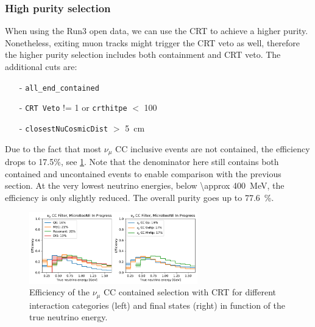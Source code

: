 \subsubsection{High purity selection}
When using the Run3 open data, we can use the CRT to achieve  a higher purity. Nonetheless, exiting muon tracks might trigger the CRT veto as well, therefore the higher purity selection includes both containment and CRT veto. The additional cuts are:
\begin{itemize}
    \item[-] \texttt{all\_end\_contained}
    \item[-] \texttt{CRT Veto} != 1 or \texttt{crthitpe} $<$ 100
    \item[-] \texttt{closestNuCosmicDist} $>$ \SI{5}{\cm}
\end{itemize}
Due to the fact that most $\nu_\mu$ CC inclusive events are not contained, the efficiency drops to 17.5\%, see \cref{fig:numu:eff_r3}. Note that the denominator here still contains both contained and uncontained events to enable comparison with the previous section. At the very lowest neutrino energies, below \SI{\approx 400}{\MeV}, the efficiency is only slightly reduced. The overall purity goes up to \SI{77.6}{\%}. 

\begin{figure}[H]
    \centering
    \includegraphics[width=0.65\textwidth]{NuMuCCsel/Images/run3/numu_efficiency_run3.pdf}
    \caption{Efficiency of the $\nu_\mu$ CC contained selection with CRT for different interaction categories (left) and final states (right) in function of the true neutrino energy.}
    \label{fig:numu:eff_r3}
\end{figure}

